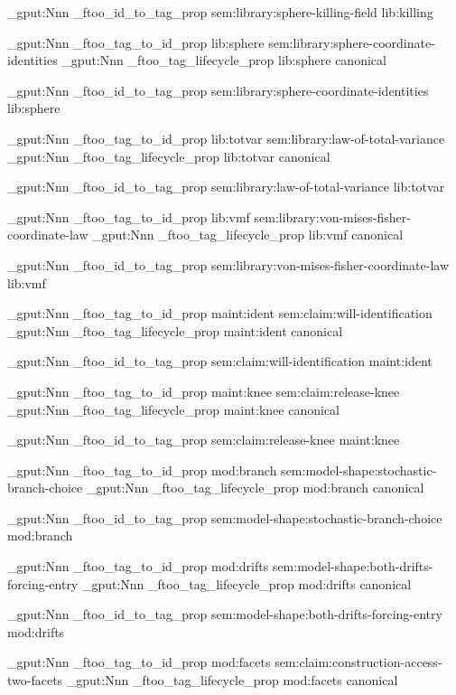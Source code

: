 \prop_gput:Nnn \g_ftoo_id_to_tag_prop { sem:library:sphere-killing-field } { lib:killing }


\prop_gput:Nnn \g_ftoo_tag_to_id_prop { lib:sphere } { sem:library:sphere-coordinate-identities }
\prop_gput:Nnn \g_ftoo_tag_lifecycle_prop { lib:sphere } { canonical }

\prop_gput:Nnn \g_ftoo_id_to_tag_prop { sem:library:sphere-coordinate-identities } { lib:sphere }


\prop_gput:Nnn \g_ftoo_tag_to_id_prop { lib:totvar } { sem:library:law-of-total-variance }
\prop_gput:Nnn \g_ftoo_tag_lifecycle_prop { lib:totvar } { canonical }

\prop_gput:Nnn \g_ftoo_id_to_tag_prop { sem:library:law-of-total-variance } { lib:totvar }


\prop_gput:Nnn \g_ftoo_tag_to_id_prop { lib:vmf } { sem:library:von-mises-fisher-coordinate-law }
\prop_gput:Nnn \g_ftoo_tag_lifecycle_prop { lib:vmf } { canonical }

\prop_gput:Nnn \g_ftoo_id_to_tag_prop { sem:library:von-mises-fisher-coordinate-law } { lib:vmf }


\prop_gput:Nnn \g_ftoo_tag_to_id_prop { maint:ident } { sem:claim:will-identification }
\prop_gput:Nnn \g_ftoo_tag_lifecycle_prop { maint:ident } { canonical }

\prop_gput:Nnn \g_ftoo_id_to_tag_prop { sem:claim:will-identification } { maint:ident }


\prop_gput:Nnn \g_ftoo_tag_to_id_prop { maint:knee } { sem:claim:release-knee }
\prop_gput:Nnn \g_ftoo_tag_lifecycle_prop { maint:knee } { canonical }

\prop_gput:Nnn \g_ftoo_id_to_tag_prop { sem:claim:release-knee } { maint:knee }


\prop_gput:Nnn \g_ftoo_tag_to_id_prop { mod:branch } { sem:model-shape:stochastic-branch-choice }
\prop_gput:Nnn \g_ftoo_tag_lifecycle_prop { mod:branch } { canonical }

\prop_gput:Nnn \g_ftoo_id_to_tag_prop { sem:model-shape:stochastic-branch-choice } { mod:branch }


\prop_gput:Nnn \g_ftoo_tag_to_id_prop { mod:drifts } { sem:model-shape:both-drifts-forcing-entry }
\prop_gput:Nnn \g_ftoo_tag_lifecycle_prop { mod:drifts } { canonical }

\prop_gput:Nnn \g_ftoo_id_to_tag_prop { sem:model-shape:both-drifts-forcing-entry } { mod:drifts }


\prop_gput:Nnn \g_ftoo_tag_to_id_prop { mod:facets } { sem:claim:construction-access-two-facets }
\prop_gput:Nnn \g_ftoo_tag_lifecycle_prop { mod:facets } { canonical }

